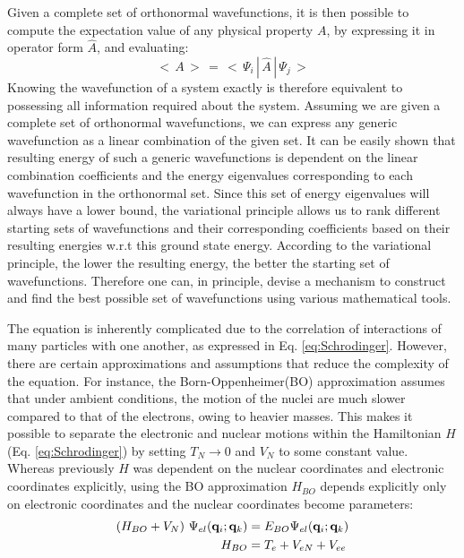             Given a complete set of orthonormal wavefunctions, it is then possible to compute the expectation value of any physical property $A$, by expressing it in operator form $\hat{A}$, and evaluating:
            \begin{equation}\label{eq:expectation value}
                <\,A\,>\, =\, < \,\Psi_i\,|\,\hat{A}\,|\, \Psi_j\,>
            \end{equation}
            Knowing the wavefunction of a system exactly is therefore equivalent to possessing all information required about the system. Assuming we are given a complete set of orthonormal wavefunctions, we can express any generic wavefunction as a linear combination of the given set. It can be easily shown that resulting energy of such a generic wavefunctions is dependent on the linear combination coefficients and the energy eigenvalues corresponding to each wavefunction in the orthonormal set. Since this set of energy eigenvalues will always have a lower bound, the variational principle allows us to rank different starting sets of wavefunctions and their corresponding coefficients based on their resulting energies w.r.t this ground state energy. According to the variational principle, the lower the resulting energy, the better the starting set of wavefunctions. Therefore one can, in principle, devise a mechanism to construct and find the best possible set of wavefunctions using various mathematical tools.

            The \Schrodinger{} equation is inherently complicated due to the correlation of interactions of many particles with one another, as expressed in Eq. \eqref{eq:Schrodinger}. However, there are certain approximations and assumptions that reduce the complexity of the equation. For instance, the Born-Oppenheimer(BO) approximation assumes that under ambient conditions, the motion of the nuclei are much slower compared to that of the electrons, owing to heavier masses. This makes it possible to separate the electronic and nuclear motions within the Hamiltonian $H$ (Eq. \eqref{eq:Schrodinger}) by setting $T_N \to 0$ and $V_N$ to some constant value. Whereas previously $H$ was dependent on the nuclear coordinates and electronic coordinates explicitly, using the BO approximation $H_{BO}$ depends explicitly only on electronic coordinates and the nuclear coordinates become parameters:
            \begin{equation}\label{eq:BO approximation}
                \begin{aligned}
                    (H_{BO} + V_N)~\Psi_{el} ({\mathbf {q}}_i;{\mathbf {q}}_k) &= E_{BO} \Psi_{el} ({\mathbf {q}}_i;{\mathbf {q}}_k)\\
                    H_{BO} &= T_e + V_{eN} + V_{ee}
                \end{aligned}
            \end{equation}

